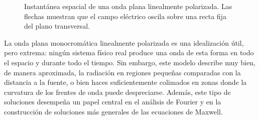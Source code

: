 \documentclass[12pt,a4paper]{article}
\theoremstyle{definition}
\theoremstyle{plain}
\numberwithin{equation}{section}
\theoremstyle{remark}
\newcommand{\E}{\vec{E}}
\newcommand{\A}{\vec{A}}
\begin{document}
\begin{figure}[ht]
    \centering
    \begingroup
    \shorthandoff{<>}
    \endgroup
    \caption{Instantánea espacial de una onda plana linealmente polarizada. Las flechas muestran que el campo eléctrico oscila sobre una recta fija del plano transversal.}
    \label{fig:polarizacion-lineal-instantanea}
\end{figure}



La onda plana monocromática linealmente polarizada es una idealización útil, pero extrema: ningún sistema físico real produce una onda de esta forma en todo el espacio y durante todo el tiempo. Sin embargo, este modelo describe muy bien, de manera aproximada, la radiación en regiones pequeñas comparadas con la distancia a la fuente, o bien haces suficientemente colimados en zonas donde la curvatura de los frentes de onda puede despreciarse. Además, este tipo de soluciones desempeña un papel central en el análisis de Fourier y en la construcción de soluciones más generales de las ecuaciones de Maxwell.
\end{document}
